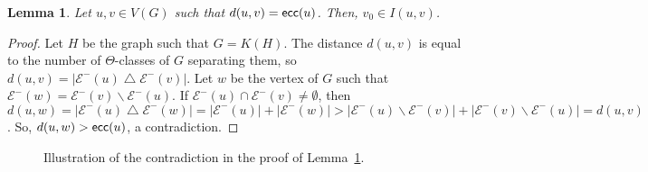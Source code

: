 \documentclass{article}
\newtheorem{lemma}{Lemma}
\newcommand{\card}[1]{\left| #1 \right|}
\newcommand{\ecc}{\mbox{\textsf{ecc}}}
\begin{document}
\begin{lemma}
Let $u,v \in V(G)$ such that $d(u,v) = \ecc(u)$. Then, $v_0 \in I(u,v)$.
\label{le:center_simplex}
\end{lemma}
\begin{proof}
Let $H$ be the graph such that $G = K(H)$. The distance $d(u,v)$ is equal to the number of $\Theta$-classes of $G$ separating them, so $d(u,v) = \card{\mathcal{E}^-(u) \bigtriangleup \mathcal{E}^-(v)}$. Let $w$ be the vertex of $G$ such that $\mathcal{E}^-(w) = \mathcal{E}^-(v) \backslash \mathcal{E}^-(u)$. If $\mathcal{E}^-(u) \cap \mathcal{E}^-(v) \neq \emptyset$, then $d(u,w) = \card{\mathcal{E}^-(u) \bigtriangleup \mathcal{E}^-(w)} = \card{\mathcal{E}^-(u)} + \card{\mathcal{E}^-(w)} > \card{\mathcal{E}^-(u) \backslash \mathcal{E}^-(v)} + \card{\mathcal{E}^-(v) \backslash \mathcal{E}^-(u)} = d(u,v)$. So, $d(u,w) > \ecc(u)$, a contradiction.
%
%
\end{proof}

\begin{figure}[h]
\centering
\scalebox{0.8}{}
\caption{Illustration of the contradiction in the proof of Lemma~\ref{le:center_simplex}.}
\label{fig:center_simplex}
\end{figure}
\end{document}

